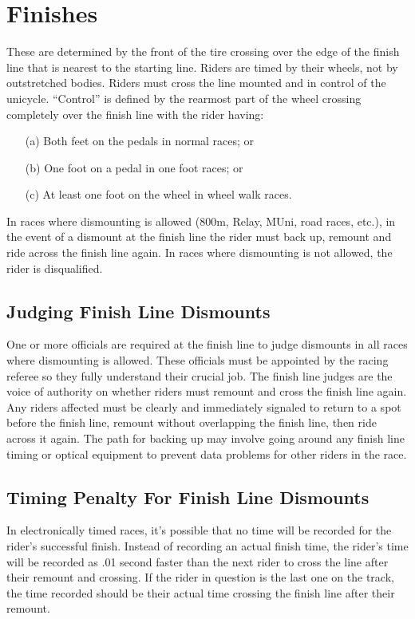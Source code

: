 \section{Finishes \label{sec:racing_finishes}}
These are determined by the front of the tire crossing over the edge of the finish line that is nearest to the starting line.
Riders are timed by their wheels, not by outstretched bodies.
Riders must cross the line mounted and in control of the unicycle.
``Control'' is defined by the rearmost part of the wheel crossing completely over the finish line with the rider having: 
\begin{enumerate}
\item[(a)] Both feet on the pedals in normal races; or 
\item[(b)] One foot on a pedal in one foot races; or 
\item[(c)] At least one foot on the wheel in wheel walk races.
\end{enumerate}
In races where dismounting is allowed (800m, Relay, MUni, road races, etc.), in the event of a dismount at the finish line the rider must back up, remount and ride across the finish line again.
In races where dismounting is not allowed, the rider is disqualified.

\subsection{Judging Finish Line Dismounts}
One or more officials are required at the finish line to judge dismounts in all races where dismounting is allowed.
These officials must be appointed by the racing referee so they fully understand their crucial job.
The finish line judges are the voice of authority on whether riders must remount and cross the finish line again.
Any riders affected must be clearly and immediately signaled to return to a spot before the finish line, remount without overlapping the finish line, then ride across it again.
The path for backing up may involve going around any finish line timing or optical equipment to prevent data problems for other riders in the race.

\subsection{Timing Penalty For Finish Line Dismounts}
In electronically timed races, it's possible that no time will be recorded for the rider's successful finish.
Instead of recording an actual finish time, the rider's time will be recorded as .01 second faster than the next rider to cross the line after their remount and crossing.
If the rider in question is the last one on the track, the time recorded should be their actual time crossing the finish line after their remount.

